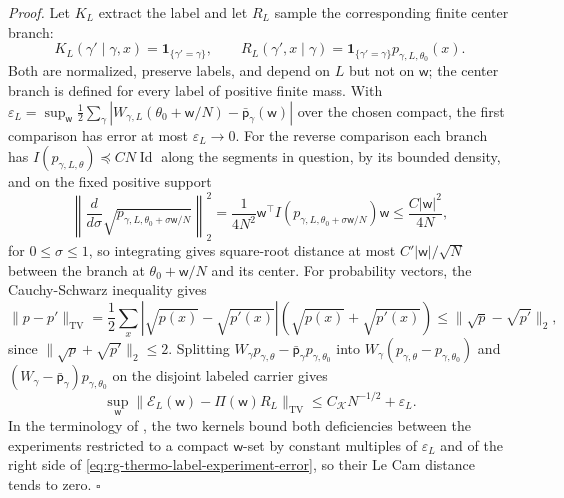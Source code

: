 \noindent\emph{Proof.}
Let $K_L$ extract the label and let $R_L$ sample the corresponding finite
center branch:
\begin{equation}
 K_L(\gamma'\mid\gamma,x)=\boldsymbol1_{\{\gamma'=\gamma\}},\qquad
 R_L(\gamma',x\mid\gamma)=\boldsymbol1_{\{\gamma'=\gamma\}}
                                      p_{\gamma,L,\theta_0}(x).
 \label{eq:rg-thermo-label-comparison-kernels}
\end{equation}
Both are normalized, preserve labels, and depend on $L$ but not on
$\mathsf w$; the center branch is defined for every label of positive finite
mass. With
$\varepsilon_L=\sup_{\mathsf w}\frac12\sum_\gamma
 |W_{\gamma,L}(\theta_0+\mathsf w/N)-\bar{\mathsf p}_\gamma(\mathsf w)|$ over
the chosen compact, the first comparison has error at most
$\varepsilon_L\to0$. For the reverse comparison each branch has
$I(p_{\gamma,L,\theta})\preceq CN\operatorname{Id}$ along the segments in
question, by its bounded density, and on the fixed positive support
\begin{equation}
 \left\|\frac{d}{d\sigma}
        \sqrt{p_{\gamma,L,\theta_0+\sigma\mathsf w/N}}\right\|_2^2
 =\frac1{4N^2}\mathsf w^\top
       I(p_{\gamma,L,\theta_0+\sigma\mathsf w/N})\mathsf w
 \leq\frac{C|\mathsf w|^2}{4N},
 \label{eq:rg-thermo-label-square-root-bound}
\end{equation}
for $0\le\sigma\le1$, so integrating gives square-root distance at most
$C'|\mathsf w|/\sqrt N$
between the branch at $\theta_0+\mathsf w/N$ and its center. For probability
vectors, the Cauchy-Schwarz inequality gives
\begin{equation}
 \|p-p'\|_{\mathrm{TV}}
 =\frac12\sum_x|\sqrt{p(x)}-\sqrt{p'(x)}|
                      (\sqrt{p(x)}+\sqrt{p'(x)})
 \leq\|\sqrt p-\sqrt{p'}\|_2,
 \label{eq:rg-thermo-label-tv-square-root}
\end{equation}
since $\|\sqrt p+\sqrt{p'}\|_2\leq2$. Splitting
$W_\gamma p_{\gamma,\theta}-\bar{\mathsf p}_\gamma p_{\gamma,\theta_0}$ into
$W_\gamma(p_{\gamma,\theta}-p_{\gamma,\theta_0})$ and
$(W_\gamma-\bar{\mathsf p}_\gamma)p_{\gamma,\theta_0}$ on the disjoint labeled
carrier gives
\begin{equation}
 \sup_{\mathsf w}\|\mathcal E_L(\mathsf w)-\Pi(\mathsf w)R_L\|_{\mathrm{TV}}
 \leq C_{\mathcal K}N^{-1/2}+\varepsilon_L.
 \label{eq:rg-thermo-label-experiment-error}
\end{equation}
In the terminology of \citet{LeCam1964}, the two kernels bound both
deficiencies between the experiments restricted to a compact $\mathsf w$-set
by constant multiples of $\varepsilon_L$ and of the right side of
\cref{eq:rg-thermo-label-experiment-error}, so their Le Cam distance tends to
zero. $\square$

